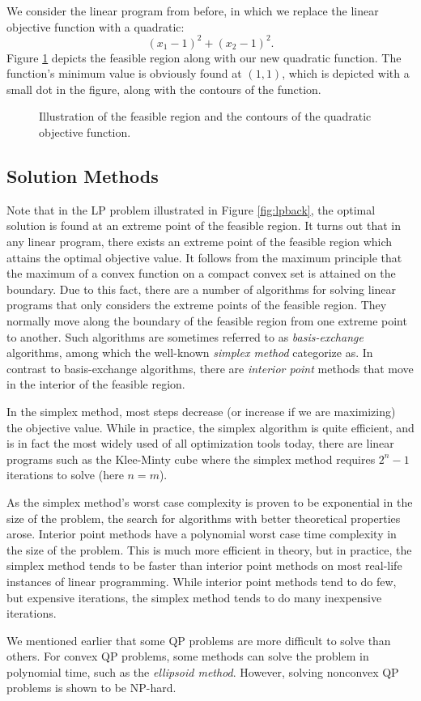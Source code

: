 We consider the linear program from before, in which we replace the linear
objective function with a quadratic:
\[
(x_1 - 1)^2 + (x_2 - 1)^2.
\]
Figure \ref{fig:qpback} depicts the feasible region along with our new
quadratic function.
The function's minimum value is obviously found at $(1,1)$, which is
depicted with a small dot in the figure, along with the contours of the
function.
\begin{figure}[ht!]
\centering

\caption{Illustration of the feasible region and the contours of the quadratic
         objective function.}
\label{fig:qpback}
\end{figure}

\subsection{Solution Methods}
Note that in the LP problem illustrated in Figure \ref{fig:lpback},
the optimal solution is found at an extreme point
of the feasible region.
It turns out that in any linear program, there exists an extreme point of the
feasible region which attains the optimal objective value.
It follows from the maximum principle that the maximum of a convex function on
a compact convex set is attained on the boundary\cite{rockafellar}.
Due to this fact, there are a number of algorithms for solving linear
programs that only considers the extreme points of the feasible region.
They normally move along the boundary of the feasible region from one extreme
point to another.
Such algorithms are sometimes referred to as \textit{basis-exchange}
algorithms, among which the well-known \textit{simplex method} categorize as.
In contrast to basis-exchange algorithms, there are \textit{interior point}
methods that move in the interior of the feasible region.

In the simplex method, most steps decrease (or increase if we are maximizing)
the objective value.
While in practice, the simplex algorithm is quite efficient, and is in fact
the most widely used of all optimization tools today\cite{nocedal}, there are
linear programs such as the Klee-Minty cube\cite{klee} where the simplex method
requires $2^n - 1$ iterations to solve (here $n = m$).

As the simplex method's worst case complexity is proven to be exponential
in the size of the problem, the search for algorithms with better theoretical
properties arose.
Interior point methods have a polynomial worst case time
complexity in the size of the problem. This is much more efficient in
theory, but in practice, the simplex method tends to be faster than interior
point methods on most real-life instances of linear programming.
While interior point methods tend
to do few, but expensive iterations, the simplex method tends to do
many inexpensive iterations.

We mentioned earlier that some QP problems are more difficult to solve than
others.
For convex QP problems, some methods can solve the problem in polynomial time,
such as the \textit{ellipsoid method}\cite{kozlov}. However, solving nonconvex
QP problems is shown to be NP-hard\cite{sahni}.
